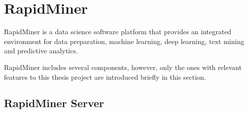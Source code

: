 
\section{RapidMiner}


RapidMiner is a data science software platform that provides an integrated environment for data preparation, machine learning, deep learning, text mining and predictive analytics.

RapidMiner includes several components, however, only the ones with relevant features to this thesis project are introduced briefly in this section.

\subsection{RapidMiner Server}

